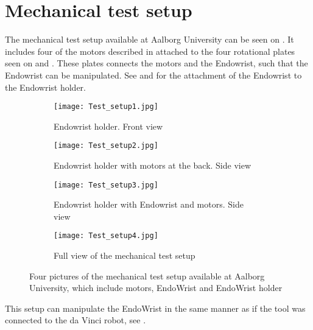 \section{Mechanical test setup}\label{sec:Mechanical_testsetup.tex}
The mechanical test setup available at Aalborg University can be seen on . It includes four of the motors described in  attached to the four rotational plates seen on  and . These plates connects the motors and the Endowrist, such that the Endowrist can be manipulated. See  and  for the attachment of the Endowrist to the Endowrist holder.  

\begin{figure}[H]
	\centering
	\begin{minipage}[t]{0.9\textwidth}
	\begin{subfigure}{0.45\textwidth}
		\vspace{-10pt}
		\centering
		\texttt{[image: Test\_setup1.jpg]}
		\caption{Endowrist holder. Front view}
		\label{fig:Mec_a}
	\end{subfigure}
	\hspace{\fill}
	\begin{subfigure}{0.45\textwidth}
		\centering
		\texttt{[image: Test\_setup2.jpg]}
		\caption{Endowrist holder with motors at the back. Side view}
		\label{fig:Mec_b}
	\end{subfigure}
	\end{minipage}

	\begin{minipage}[t]{0.9\textwidth}
	\vspace{20pt}
	\begin{subfigure}{0.45\textwidth}
		\vspace{0pt}
		\centering
		\texttt{[image: Test\_setup3.jpg]}
		\caption{Endowrist holder with Endowrist and motors. Side view}
		\label{fig:Mec_c}
	\end{subfigure}
	\hspace{\fill}
	\begin{subfigure}{0.45\textwidth}
		\centering
		\texttt{[image: Test\_setup4.jpg]}
		\caption{Full view of the mechanical test setup}
		\label{fig:Mec_d}
	\end{subfigure}
	\end{minipage}

	\caption{Four pictures of the mechanical test setup available at Aalborg University, which include motors, EndoWrist and EndoWrist holder}
	\label{fig:Mec_abcd}
\end{figure}

This setup can manipulate the EndoWrist in the same manner as if the tool was connected to the da Vinci robot, see .
